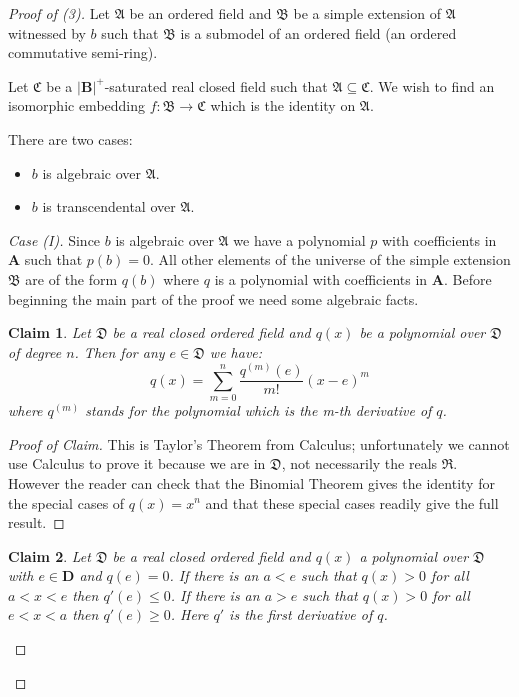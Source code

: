 \documentclass[titlepage, oneside]{amsbook}
\theoremstyle{plain}
\newtheorem*{claim}{Claim}
\theoremstyle{definition}
\theoremstyle{remark}
\newcommand{\seq}{\ensuremath{\subseteq}}
\newcommand{\ma}{\ensuremath{\mathfrak{A}}}
\newcommand{\mb}{\ensuremath{\mathfrak{B}}}
\newcommand{\mc}{\ensuremath{\mathfrak{C}}}
\newcommand{\md}{\ensuremath{\mathfrak{D}}}
\newcommand{\mr}{\ensuremath{\mathfrak{R}}}
\newcommand{\ba}{\ensuremath{\mathbf{A}}}
\newcommand{\bb}{\ensuremath{\mathbf{B}}}
\newcommand{\bd}{\ensuremath{\mathbf{D}}}
\begin{document}
\begin{proof}[Proof of (3)] Let $\ma$  be an ordered field and 
$\mb$ be a simple extension of $\ma$ witnessed by $b$ such that $\mb$
is a submodel of an ordered field (an ordered commutative semi-ring).

Let $\mc$ be a $|\bb|^+$-saturated real closed field such that $\ma \seq 
\mc$.
We wish to find an isomorphic embedding $f: \mb \to \mc$ which is the
identity on $\ma$.

There are two cases:
\begin{itemize}
\item[(I)] $b$ is algebraic over $\ma$.
\item[(II)] $b$ is transcendental over $\ma$.
\end{itemize}

\begin{proof}[Case (I)] Since $b$ is algebraic over $\ma$ we have a
polynomial $p$ with coefficients in $\ba$ such that $p (b ) = 0$.  All
other elements of the universe of the simple extension $\mb$ are of the
form $q(b)$ where $q$ is a polynomial with coefficients in $\ba$.
Before beginning the main part of the proof we need some algebraic
facts.

\begin{claim}  Let $\md$ be a real closed ordered field and $q(x) $ be
a polynomial over $\md$ of degree $n$.  Then for any $e \in \md$ we
have: \[ q(x) = \sum_{m=0}^n \frac{q^{(m)} (e)}{m!} (x-e )^m \]
where $q^{(m)}$ stands for the polynomial which is the  m-th derivative
of $q$.
\end{claim}

\begin{proof}[Proof of Claim]  This is Taylor's Theorem
from Calculus; unfortunately we cannot use Calculus to
prove it because we are in $\md$, not necessarily the
reals $\mr$.  However the reader can check that the
Binomial Theorem gives the identity for the special cases
of $q (x) = x^n$ and that these special cases readily
give the full result.

\renewcommand{\qedsymbol}{}
\end{proof}

\begin{claim} Let $\md$ be a real closed ordered field
and $q(x)$ a polynomial over $\md$ with $e \in \bd$ and
$q(e) = 0$.  If there is an $a < e$ such that $q(x) > 0$
for all $a < x <e$  then $q'(e) \leq 0$. If there is an $a > e$ such
that $q(x) > 0$ for all $e < x < a $ then $q'(e) \geq 0$.  Here $q'$ is
the first derivative of $q$.


\end{claim}
\end{proof}
\end{proof}
\end{document}
